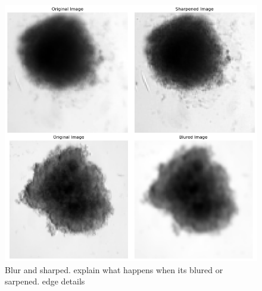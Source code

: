 \begin{figure}[H]
  \centering
  \includegraphics[scale=0.5]{figures/bs.png} 
  \caption{Blur and sharped. explain what happens when its blured or sarpened. edge details}
  \label{fig:bs}
\end{figure}

